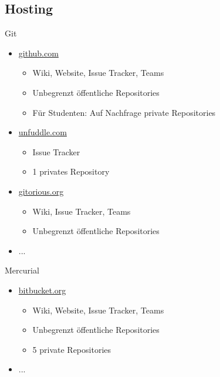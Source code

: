 \documentclass[presentation]{beamer}
\begin{document}
\subsection{Hosting}
\begin{frame}{Git}
  \begin{itemize}
  \item <1-> \href{http://github.com}{github.com}
    \begin{itemize}
    \item Wiki, Website, Issue Tracker, Teams
    \item Unbegrenzt öffentliche Repositories
    \item Für Studenten: Auf Nachfrage private Repositories
    \end{itemize}
  \item<2-> \href{http://unfuddle.com}{unfuddle.com}
    \begin{itemize}
    \item Issue Tracker
    \item 1 privates Repository
    \end{itemize}
  \item<3-> \href{http://gitorious.org}{gitorious.org}
    \begin{itemize}
    \item Wiki, Issue Tracker, Teams
    \item Unbegrenzt öffentliche Repositories
    \end{itemize}
  \item<4-> ...
  \end{itemize}
\end{frame}
\begin{frame}{Mercurial}
  \begin{itemize}
  \item<1-> \href{http://bitbucket.org}{bitbucket.org}
    \begin{itemize}
    \item Wiki, Website, Issue Tracker, Teams
    \item Unbegrenzt öffentliche Repositories
    \item 5 private Repositories
    \end{itemize}
  \item<2-> ...
  \end{itemize}
\end{frame}
\end{document}

